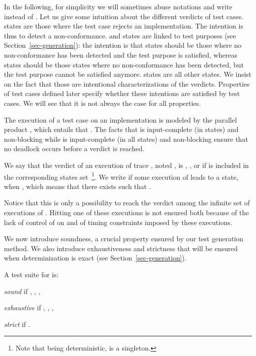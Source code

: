 \documentclass{LMCS}
\theoremstyle{plain}\newtheorem{proposition}[thm]{Proposition}
\begin{document}
\noindent In the following, for simplicity we will sometimes abuse notations and
write  instead of .  Let us give some intuition about the different verdicts of test
cases.  states are those where the test case rejects an
implementation.  The intention is thus to detect a non-conformance.
 and  states are linked to test purposes (see
Section~\ref{sec-generation}): the intention is that  states
should be those where no non-conformance has been detected and the
test purpose is satisfied, whereas  states should be those
states where no non-conformance has been detected, but the test
purpose cannot be satisfied anymore.   states are all other
states.  We insist on the fact that those are intentional
characterizations of the verdicts. Properties of test cases defined
later specify whether these intentions are satisfied by test cases.
We will see that it is not always the case for all properties.



The execution of a test case  on an implementation 
is  modeled by the parallel product ,
which entails that .
The facts that  is input-complete (in  states) 
and non-blocking 
while  
 is input-complete (in all states) and non-blocking
ensure that no deadlock occurs before a verdict is reached.



We say that the verdict of an execution of trace ,
noted , is , ,  or 
if  is included in the corresponding states
set~\footnote{Note that  being deterministic,  is a singleton.}.  
We write 
if some execution  of  leads  to a 
state, \ie when , which means that there exists  such that 
.
Notice that this is only a possibility to reach the
 verdict among the infinite set of executions of .  
Hitting one of these executions is not ensured both because 
of the lack of control of  
on  and of timing constraints imposed by these executions.


We now introduce soundness, a crucial property ensured by our test generation method. 
We also introduce exhaustiveness 
 and strictness that will be ensured  
when determinization is exact (see Section~\ref{sec-generation}).

\begin{defi}
A  test suite  for  is:
\begin{iteMize}{}
\item {\em sound} if
, , ,
\item {\em exhaustive} if 
, , ,
\item {\em strict} if  .
\end{iteMize}
\end{defi}
\end{document}
